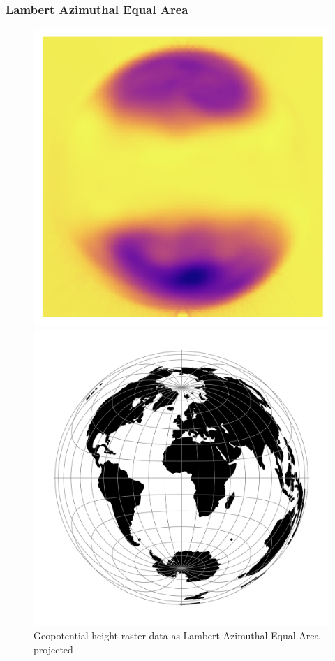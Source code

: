 \subsubsection*{Lambert Azimuthal Equal Area}
\begin{figure}[h]
    \centering
    \begin{minipage}{0.30\textwidth}
        \centering
        \includegraphics[width=0.9\linewidth]{figures/chapter-8/geopoth_laea.png}
        \caption{ Geopotential height raster data as Lambert Azimuthal Equal Area projected}
        \label{fig:laea_geopoth_raster}
    \end{minipage}\hfill
    \begin{minipage}{0.30\textwidth}
        \centering
        \includegraphics[width=0.9\linewidth]{figures/chapter-8/laea.png}

\end{minipage}
\end{figure}
